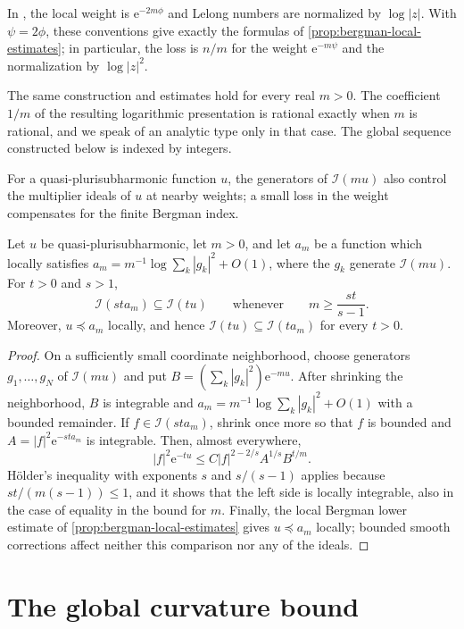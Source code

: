 In \cite{DemAM11}, the local weight is $\mathrm{e}^{-2m\phi}$ and Lelong numbers are normalized by $\log|z|$. With $\psi=2\phi$, these conventions give exactly the formulas of \cref{prop:bergman-local-estimates}; in particular, the loss is $n/m$ for the weight $\mathrm{e}^{-m\psi}$ and the normalization by $\log|z|^2$.

The same construction and estimates hold for every real $m>0$. The coefficient $1/m$ of the resulting logarithmic presentation is rational exactly when $m$ is rational, and we speak of an analytic type only in that case. The global sequence constructed below is indexed by integers.

For a quasi-plurisubharmonic function $u$, the generators of $\mathcal I(mu)$ also control the multiplier ideals of $u$ at nearby weights; a small loss in the weight compensates for the finite Bergman index.

\begin{lemma}\label{lem:bergman-controlled-ideals}
Let $u$ be quasi-plurisubharmonic, let $m>0$, and let $a_m$ be a function which locally satisfies $a_m=m^{-1}\log\sum_k|g_k|^2+O(1)$, where the $g_k$ generate $\mathcal I(mu)$. For $t>0$ and $s>1$,
\[
 \mathcal I(sta_m)\subseteq\mathcal I(tu)
 \qquad\text{whenever}\qquad m\geq\frac{st}{s-1}.
\]
Moreover, $u\preceq a_m$ locally, and hence $\mathcal I(tu)\subseteq\mathcal I(ta_m)$ for every $t>0$.
\end{lemma}
\begin{proof}
On a sufficiently small coordinate neighborhood, choose generators $g_1,\ldots,g_N$ of $\mathcal I(mu)$ and put $B=(\sum_k|g_k|^2)\mathrm{e}^{-mu}$. After shrinking the neighborhood, $B$ is integrable and $a_m=m^{-1}\log\sum_k|g_k|^2+O(1)$ with a bounded remainder. If $f\in\mathcal I(sta_m)$, shrink once more so that $f$ is bounded and $A=|f|^2\mathrm{e}^{-sta_m}$ is integrable. Then, almost everywhere,
\[
 |f|^2\mathrm{e}^{-tu}
 \leq C|f|^{2-2/s}A^{1/s}B^{t/m}.
\]
H\"older's inequality with exponents $s$ and $s/(s-1)$ applies because $st/(m(s-1))\leq1$, and it shows that the left side is locally integrable, also in the case of equality in the bound for $m$. Finally, the local Bergman lower estimate of \cref{prop:bergman-local-estimates} gives $u\preceq a_m$ locally; bounded smooth corrections affect neither this comparison nor any of the ideals.
\end{proof}

\section{The global curvature bound}

